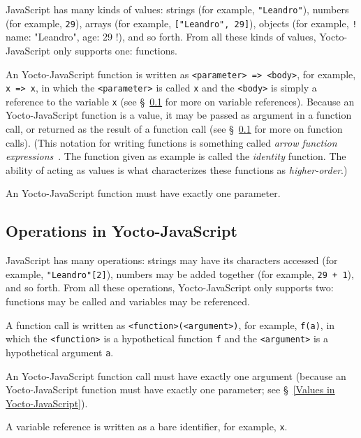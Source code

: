 \documentclass[12pt, oneside]{book}
\begin{document}
JavaScript has many kinds of values: strings (for example, \texttt{"Leandro"}), numbers (for example, \texttt{29}), arrays (for example, \texttt{["Leandro", 29]}), objects (for example, \texttt!{ name: "Leandro", age: 29 }!), and so forth. From all these kinds of values, Yocto-JavaScript only supports one: functions.

An Yocto-JavaScript function is written as \verb!<parameter> => <body>!, for example, \texttt{x => x}, in which the \verb!<parameter>! is called \texttt{x} and the \verb!<body>! is simply a reference to the variable \texttt{x} (see §~\ref{Operations in Yocto-JavaScript} for more on variable references). Because an Yocto-JavaScript function is a value, it may be passed as argument in a function call, or returned as the result of a function call (see §~\ref{Operations in Yocto-JavaScript} for more on function calls). (This notation for writing functions is something called \emph{arrow function expressions}~\cite{arrow-function-expressions}. The function given as example is called the \emph{identity} function. The ability of acting as values is what characterizes these functions as \emph{higher-order}.)

An Yocto-JavaScript function must have exactly one parameter.

\subsection{Operations in Yocto-JavaScript}
\label{Operations in Yocto-JavaScript}

JavaScript has many operations: strings may have its characters accessed (for example, \texttt{"Leandro"[2]}), numbers may be added together (for example, \texttt{29 + 1}), and so forth. From all these operations, Yocto-JavaScript only supports two: functions may be called and variables may be referenced.

A function call is written as \verb!<function>(<argument>)!, for example, \texttt{f(a)}, in which the \verb!<function>! is a hypothetical function \texttt{f} and the \verb!<argument>! is a hypothetical argument \texttt{a}.

An Yocto-JavaScript function call must have exactly one argument (because an Yocto-JavaScript function must have exactly one parameter; see §~\ref{Values in Yocto-JavaScript}).

A variable reference is written as a bare identifier, for example, \texttt{x}.
\end{document}

